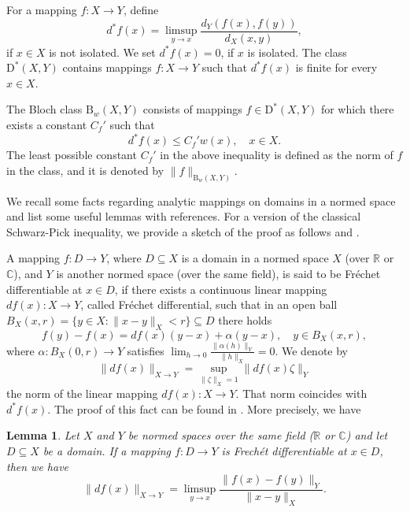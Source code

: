 \documentclass{amsart}
\newtheorem{lemma}[theorem]{Lemma}
\theoremstyle{definition}
\numberwithin{equation}{section}
\begin{document}
For a mapping $f:X\to Y$, define
\begin{equation*}
{d}^\ast f (x) = \limsup _{y\to x} \frac {d_Y ( f(x), f(y))}{d_X(x,y)},
\end{equation*}
if $x\in X$ is not isolated. We set $d^\ast f (x) = 0$, if $x$ is isolated. The class $\mathrm {D}^\ast(X,Y)$
contains mappings $f:X\to Y$ such that $d^\ast f (x)$ is finite for every $x\in X$.

The Bloch class $\mathrm{B}_{w}(X,Y)$ consists of mappings $f\in \mathrm {D}^\ast(X,Y)$ for which there exists a
constant $C_f'$ such that
\begin{equation*}
d^\ast f(x) \le C_f'  w(x),\quad  x\in X.
\end{equation*}
The least possible constant $C_f'$ in the above inequality is defined as the norm of $f$ in the class, and it is
denoted by $\|f\|_{\mathrm {B}_{w} (X,Y)}$.

\medskip


We recall some facts regarding analytic mappings on domains in a normed space and list some useful lemmas with
references. For a version of the classical Schwarz-Pick inequality, we provide a sketch of the proof as follows
\cite{BLASCO.JFA} and \cite{KALAJ.GJM}.

A mapping $f:D\to Y$, where $D \subseteq X$ is a domain in a normed space $X$ (over $\mathbb{R}$ or $\mathbb{C}$), and
$Y$ is another normed space (over the same field), is said to be Fr\'{e}chet differentiable at $x\in D$, if there exists
a continuous linear mapping $d f(x):X\to Y$, called Fr\'{e}chet differential, such that in an open ball
$B_X(x,r) = \{y\in X: \|x-y\|_X < r\}\subseteq D$ there holds
\begin{equation*}
f(y) -  f(x) = d f (x)  (y-x) +  \alpha (y-x),\quad y\in B_X(x,r),
\end{equation*}
where $\alpha:B_X (0,r)\to  Y$ satisfies $\lim _{h\to  0} \frac {\|\alpha (h)\|_Y}{\|h\|_X} = 0$. We denote by
\begin{equation*}
\|d f (x)\|_{X\to Y} = \sup _{\|\zeta\|_X = 1} \|d f(x)\zeta\|_Y
\end{equation*}
the norm of the linear mapping $d f(x): X\to Y$. That norm coincides with $d^\ast f(x)$. The proof of this fact can be
found in \cite{MARKOVIC.JGA.1}. More precisely, we have

\begin{lemma}\label{LE.FRECHET}
Let $X$ and $Y$ be normed spaces over the same field ($\mathbb{R}$ or $\mathbb{C}$) and let $D\subseteq X$ be a domain.
If a mapping $f:D\to Y$ is Frech\'{e}t differentiable at $x\in D$, then we have
\begin{equation*}
\| d f (x) \|_{X\to Y} =  \limsup_{y\to x} \frac {\|f(x) - f(y)\|_Y}{\|x - y\|_X}.
\end{equation*}
\end{lemma}
\end{document}
